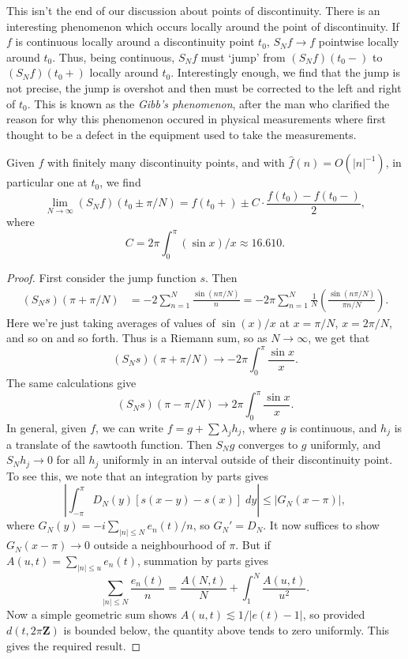 This isn't the end of our discussion about points of discontinuity. There is an interesting phenomenon which occurs locally around the point of discontinuity. If $f$ is continuous locally around a discontinuity point $t_0$, $S_N f \to f$ pointwise locally around $t_0$. Thus, being continuous, $S_N f$ must `jump' from $(S_N f)(t_0-)$ to $(S_N f)(t_0+)$ locally around $t_0$. Interestingly enough, we find that the jump is not precise, the jump is overshot and then must be corrected to the left and right of $t_0$. This is known as the {\it Gibb's phenomenon}, after the man who clarified the reason for why this phenomenon occured in physical measurements where first thought to be a defect in the equipment used to take the measurements.

\begin{theorem}
	Given $f$ with finitely many discontinuity points, and with $\widehat{f}(n) = O(|n|^{-1})$, in particular one at $t_0$, we find
	\[ \lim_{N \to \infty} (S_N f)(t_0 \pm \pi/N) = f(t_0+) \pm C \cdot \frac{f(t_0) - f(t_0-)}{2}, \]
	where
	\[ C = 2 \pi \int_0^\pi (\sin x)/x \approx 16.610. \]
\end{theorem}
\begin{proof}
	First consider the jump function $s$. Then
	\begin{align*}
		(S_N s)(\pi + \pi/N) &= -2 \sum_{n = 1}^N \frac{\sin(n\pi/N)}{n} = -2\pi \sum_{n = 1}^N \frac{1}{N} \left( \frac{\sin(n\pi/N)}{\pi n/N} \right).
	\end{align*}
	Here we're just taking averages of values of $\sin(x)/x$ at $x = \pi/N$, $x = 2\pi/N$, and so on and so forth. Thus is a Riemann sum, so as $N \to \infty$, we get that
	\[ (S_N s)(\pi + \pi/N) \to - 2\pi \int_0^\pi \frac{\sin x}{x}. \]
	The same calculations give
	\[ (S_N s)(\pi - \pi/N) \to 2 \pi \int_0^\pi \frac{\sin x}{x}. \]
	In general, given $f$, we can write $f = g + \sum \lambda_j h_j$, where $g$ is continuous, and $h_j$ is a translate of the sawtooth function. Then $S_N g$ converges to $g$ uniformly, and $S_N h_j \to 0$ for all $h_j$ uniformly in an interval outside of their discontinuity point. To see this, we note that an integration by parts gives
	\[ \left| \int_{-\pi}^\pi D_N(y)[s(x-y) - s(x)]\; dy \right| \leq |G_N(x - \pi)|, \]
	where $G_N(y) = -i \sum_{|n| \leq N} e_n(t)/n$, so $G_N' = D_N$. It now suffices to show $G_N(x - \pi) \to 0$ outside a neighbourhood of $\pi$. But if $A(u,t) = \sum_{|n| \leq u} e_n(t)$, summation by parts gives
	\[ \sum_{|n| \leq N} \frac{e_n(t)}{n} = \frac{A(N,t)}{N} + \int_1^N \frac{A(u,t)}{u^2}. \]
	Now a simple geometric sum shows $A(u,t) \lesssim 1/|e(t) - 1|$, so provided $d(t, 2 \pi \mathbf{Z})$ is bounded below, the quantity above tends to zero uniformly. This gives the required result.
\end{proof}

